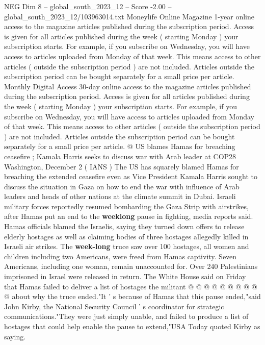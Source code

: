 \begin{textsample}{NEG Dim 8 – global\_south\_2023\_12 – Score -2.00 – global\_south\_2023\_12/103963014.txt}  \label{ex:f8_neg_013}
Moneylife Online Magazine 1-year online access to the magazine articles published during the subscription period.
Access is given for all articles published during the week ( starting Monday ) your subscription starts.
For example, if you subscribe on Wednesday, you will have access to articles uploaded from Monday of that week.
This means access to other articles ( outside the subscription period ) are not included.
Articles outside the subscription period can be bought separately for a small price per article.
Monthly Digital Access 30-day online access to the magazine articles published during the subscription period.
Access is given for all articles published during the week ( starting Monday ) your subscription starts.
For example, if you subscribe on Wednesday, you will have access to articles uploaded from Monday of that week.
This means access to other articles ( outside the subscription period ) are not included.
Articles outside the subscription period can be bought separately for a small price per article. @ US blames Hamas for breaching ceasefire ; Kamala Harris seeks to discuss war with Arab leader at COP28 Washington, December 2 ( IANS ) The US has squarely blamed Hamas for breaching the extended ceasefire even as Vice President Kamala Harris sought to discuss the situation in Gaza on how to end the war with influence of Arab leaders and heads of other nations at the climate summit in Dubai.
Israeli military forces reportedly resumed bombarding the Gaza Strip with airstrikes, after Hamas put an end to the \textbf{weeklong} pause in fighting, media reports said.
Hamas officials blamed the Israelis, saying they turned down offers to release elderly hostages as well as claiming bodies of three hostages allegedly killed in Israeli air strikes.
The \textbf{week-long} truce saw over 100 hostages, all women and children including two Americans, were freed from Hamas captivity.
Seven Americans, including one woman, remain unaccounted for.
Over 240 Palestinians imprisoned in Israel were released in return.
The White House said on Friday that Hamas failed to deliver a list of hostages the militant @ @ @ @ @ @ @ @ @ @ about why the truce ended."It ' s because of Hamas that this pause ended,"said John Kirby, the National Security Council ' s coordinator for strategic communications."They were just simply unable, and failed to produce a list of hostages that could help enable the pause to extend,"USA Today quoted Kirby as saying.

\end{textsample}

